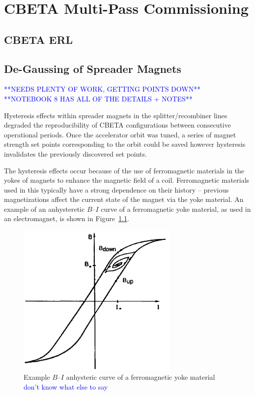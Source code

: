 \documentclass[../main.tex]{subfiles}
\begin{document}
\chapter{CBETA Multi-Pass Commissioning}
\label{CBETA_Multi-Pass_Commissioning} %

\section{CBETA ERL}

\section{De-Gaussing of Spreader Magnets}

\textcolor{blue}{**NEEDS PLENTY OF WORK, GETTING POINTS DOWN** \\ **NOTEBOOK 8 HAS ALL OF THE DETAILS + NOTES**}

Hysteresis effects within spreader magnets in the splitter/recombiner lines degraded the reproducibility of CBETA configurations between consecutive operational periods. Once the accelerator orbit was tuned, a series of magnet strength set points corresponding to the orbit could be saved however hysteresis invalidates the previously discovered set points.

The hysteresis effects occur because of the use of ferromagnetic materials in the yokes of magnets to enhance the magnetic field of a coil. Ferromagnetic materials used in this typically have a strong dependence on their history \cite{decker1991physical} -- previous magnetizations affect the current state of the magnet via the yoke material. An example of an anhysteretic $B$--$I$ curve of a ferromagnetic yoke material, as used in an electromagnet, is shown in Figure~\ref{fig:example_BI_curve}.

\begin{figure}[!h]
\centering
\includegraphics[width=0.7\textwidth]{Figures/CBETA_Multi-Pass_Commissioning/degauss/example_BI_curve.png}
\caption{Example $B$--$I$ anhysteric curve of a ferromagnetic yoke material \cite{decker1991physical} \textcolor{blue}{don't know what else to say}}
\label{fig:example_BI_curve}
\end{figure}
\end{document}
